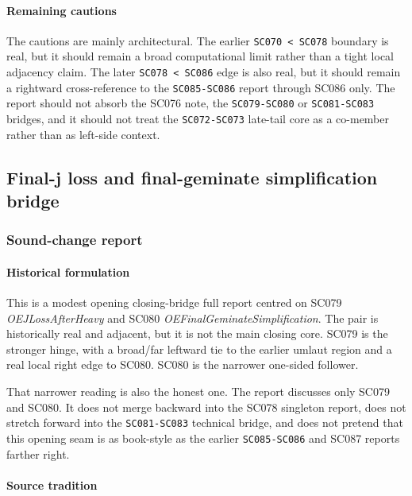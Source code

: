 \documentclass[
  british,
  a4paper,
]{article}
\begin{document}
\paragraph{Remaining cautions}\label{remaining-cautions-48}

The cautions are mainly architectural. The earlier
\texttt{SC070\ \textless{}\ SC078} boundary is real, but it should
remain a broad computational limit rather than a tight local adjacency
claim. The later \texttt{SC078\ \textless{}\ SC086} edge is also real,
but it should remain a rightward cross-reference to the
\texttt{SC085-SC086} report through SC086 only. The report should not
absorb the SC076 note, the \texttt{SC079-SC080} or \texttt{SC081-SC083}
bridges, and it should not treat the \texttt{SC072-SC073} late-tail core
as a co-member rather than as left-side context.

\subsection{Final-j loss and final-geminate simplification
bridge}\label{final-j-loss-and-final-geminate-simplification-bridge}

\subsubsection{Sound-change report}\label{sound-change-report-49}

\paragraph{Historical formulation}\label{historical-formulation-49}

This is a modest opening closing-bridge full report centred on SC079
\emph{OEJLossAfterHeavy} and SC080 \emph{OEFinalGeminateSimplification}.
The pair is historically real and adjacent, but it is not the main
closing core. SC079 is the stronger hinge, with a broad/far leftward tie
to the earlier umlaut region and a real local right edge to SC080. SC080
is the narrower one-sided follower.

That narrower reading is also the honest one. The report discusses only
SC079 and SC080. It does not merge backward into the SC078 singleton
report, does not stretch forward into the \texttt{SC081-SC083} technical
bridge, and does not pretend that this opening seam is as book-style as
the earlier \texttt{SC085-SC086} and SC087 reports farther right.

\paragraph{Source tradition}\label{source-tradition-49}
\end{document}
